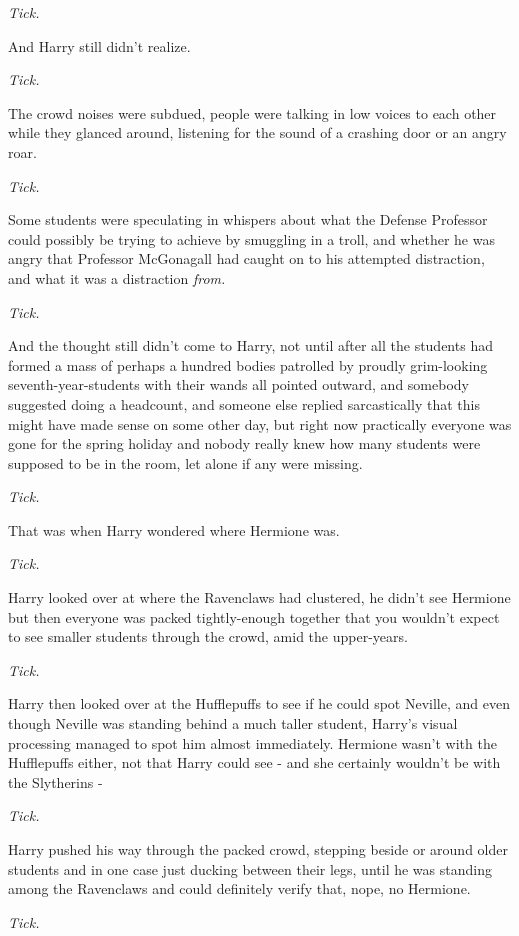 \emph{Tick.}

And Harry still didn't realize.

\emph{Tick.}

The crowd noises were subdued, people were talking in low voices to each
other while they glanced around, listening for the sound of a crashing
door or an angry roar.

\emph{Tick.}

Some students were speculating in whispers about what the Defense
Professor could possibly be trying to achieve by smuggling in a troll,
and whether he was angry that Professor McGonagall had caught on to his
attempted distraction, and what it was a distraction \emph{from.}

\emph{Tick.}

And the thought still didn't come to Harry, not until after all the
students had formed a mass of perhaps a hundred bodies patrolled by
proudly grim-looking seventh-year-students with their wands all pointed
outward, and somebody suggested doing a headcount, and someone else
replied sarcastically that this might have made sense on some other day,
but right now practically everyone was gone for the spring holiday and
nobody really knew how many students were supposed to be in the room,
let alone if any were missing.

\emph{Tick.}

That was when Harry wondered where Hermione was.

\emph{Tick.}

Harry looked over at where the Ravenclaws had clustered, he didn't see
Hermione but then everyone was packed tightly-enough together that you
wouldn't expect to see smaller students through the crowd, amid the
upper-years.

\emph{Tick.}

Harry then looked over at the Hufflepuffs to see if he could spot
Neville, and even though Neville was standing behind a much taller
student, Harry's visual processing managed to spot him almost
immediately. Hermione wasn't with the Hufflepuffs either, not that Harry
could see - and she certainly wouldn't be with the Slytherins -

\emph{Tick.}

Harry pushed his way through the packed crowd, stepping beside or around
older students and in one case just ducking between their legs, until he
was standing among the Ravenclaws and could definitely verify that,
nope, no Hermione.

\emph{Tick.}

